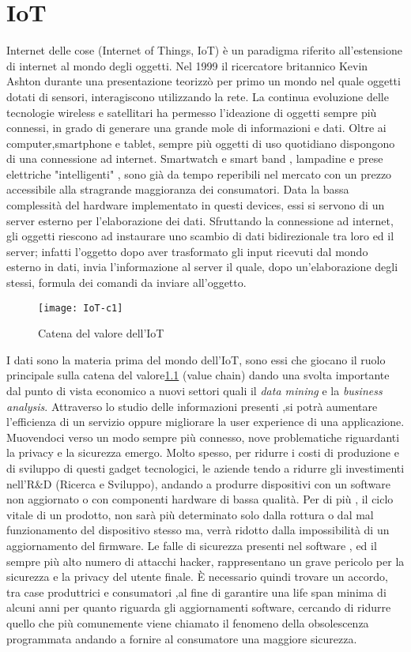 \chapter{IoT}
Internet delle cose (Internet of Things, IoT) è un paradigma riferito
all’estensione di internet al mondo degli oggetti. Nel 1999 il ricercatore
britannico Kevin Ashton durante una presentazione teorizzò  per primo un mondo
nel quale oggetti dotati di sensori, interagiscono utilizzando la rete.  La
continua evoluzione delle tecnologie wireless e satellitari ha permesso
l'ideazione di oggetti sempre più connessi, in grado di generare una grande mole
di informazioni e dati. Oltre ai computer,smartphone e tablet, sempre più
oggetti di uso quotidiano dispongono di una connessione ad internet. Smartwatch
e smart band , lampadine e prese elettriche "intelligenti" ,  sono già da tempo
reperibili nel mercato con un prezzo accessibile alla stragrande maggioranza dei
consumatori.  Data la bassa
complessità del hardware implementato in questi devices, essi si servono di
 un server esterno per l'elaborazione dei dati.  Sfruttando la
connessione ad internet, gli oggetti riescono ad instaurare uno scambio di dati
bidirezionale tra loro ed il server; infatti l'oggetto dopo aver trasformato gli
input ricevuti dal mondo esterno in dati, invia l'informazione al server il
quale, dopo un'elaborazione degli stessi, formula dei comandi da inviare
all'oggetto.
\\
\begin{figure}[h]
        \centering 
                \texttt{[image: IoT-c1]}
        \caption{Catena del valore dell'IoT}
        \label{fig:IoT_chain}
\end{figure}
I dati sono la materia prima del mondo dell'IoT, sono essi che giocano il ruolo
principale sulla catena del valore\ref{fig:IoT_chain} (value chain) dando una svolta importante dal
punto di vista economico a nuovi settori quali il \emph{data mining} e la
\emph{business analysis}.
Attraverso lo studio delle informazioni presenti ,si potrà  aumentare l’efficienza di un
servizio oppure  migliorare la user experience di una applicazione.
Muovendoci verso un modo sempre più connesso, nove problematiche riguardanti la
privacy e la sicurezza emergo.  Molto spesso, per ridurre i costi di produzione e
di sviluppo di questi gadget tecnologici, le aziende tendo a ridurre gli
investimenti nell'R\&D (Ricerca e Sviluppo), andando a produrre dispositivi con
un software non aggiornato o con componenti hardware di bassa qualità. Per di
più , il ciclo vitale di un prodotto, non sarà più determinato solo dalla
rottura o dal mal funzionamento del dispositivo stesso ma, verrà ridotto dalla
impossibilità di un aggiornamento del firmware.
Le falle di sicurezza presenti nel software , ed il sempre più alto numero di
attacchi hacker, rappresentano un grave  pericolo per la sicurezza e la privacy del utente
finale.
È necessario quindi trovare un accordo, tra case produttrici e
consumatori ,al fine di garantire una life span minima di alcuni anni per quanto
riguarda gli aggiornamenti software, cercando di ridurre quello che più comunemente
viene chiamato il fenomeno della obsolescenza programmata andando a fornire al
consumatore una  maggiore sicurezza.
